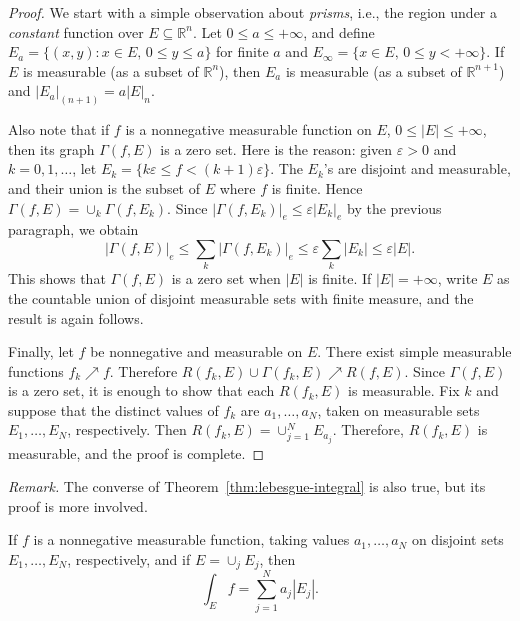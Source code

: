 \documentclass[11pt]{article}
\begin{document}
\begin{proof}
We start with a simple observation about \textit{prisms}, i.e., the region under a \textit{constant} function over $E \subseteq \mathbb{R}^n$.
Let $0 \leqslant a \leqslant +\infty$, and define $E_a = \{ (x,y) \colon x \in E, \, 0 \leqslant y \leqslant a \}$ for finite $a$ and $E_\infty = \{ x \in E, \, 0 \leqslant y < +\infty \}$.  If $E$ is measurable (as a subset of $\mathbb{R}^n$), then $E_a$ is measurable (as a subset of $\mathbb{R}^{n+1}$) and $|E_a|_{(n+1)} = a |E|_n$.

Also note that if $f$ is a nonnegative measurable function on $E$, $0 \leqslant |E| \leqslant +\infty$, then its graph $\Gamma(f,E)$ is a zero set.  Here is the reason: given $\varepsilon > 0$ and $k = 0, 1, \dots$, let $E_k = \{ k\varepsilon \leqslant f < (k+1) \varepsilon \}$.  The $E_k$'s are disjoint and measurable, and their union is the subset of $E$ where $f$ is finite.  Hence $\Gamma(f,E) = \cup_k \Gamma(f,E_k)$.  Since $|\Gamma(f,E_k)|_e \leqslant \varepsilon |E_k|_e$ by the previous paragraph, we obtain
\[
  |\Gamma(f,E)|_e \leqslant \sum_k |\Gamma(f,E_k)|_e \leqslant \varepsilon \sum_k |E_k| \leqslant \varepsilon |E|.
\]
This shows that $\Gamma(f,E)$ is a zero set when $|E|$ is finite.  If $|E| = +\infty$, write $E$ as the countable union of disjoint measurable sets with finite measure, and the result is again follows.

Finally, let $f$ be nonnegative and measurable on $E$.  There exist simple measurable functions $f_k \nearrow f$.  Therefore $R(f_k, E) \cup \Gamma(f_k, E) \nearrow R(f,E)$.  Since $\Gamma(f,E)$ is a zero set, it is enough to show that each $R(f_k,E)$ is measurable.  Fix $k$ and suppose that the distinct values of $f_k$ are $a_1, \dots, a_N$, taken on measurable sets $E_1, \dots, E_N$, respectively.  Then $R(f_k,E) = \cup_{j=1}^N E_{a_j}$.  Therefore, $R(f_k,E)$ is measurable, and the proof is complete.
\end{proof}

\noindent\textit{Remark.} The converse of Theorem~\ref{thm:lebesgue-integral} is also true, but its proof is more involved.

\begin{cor}
  \label{cor:lebesgue-int}
  If $f$ is a nonnegative measurable function, taking values $a_1, \dots, a_N$ on disjoint sets $E_1, \dots, E_N$, respectively, and if $E = \cup_j E_j$, then
  \[
    \int_E f = \sum_{j=1}^N a_j |E_j|.
  \]
\end{cor}
\end{document}
